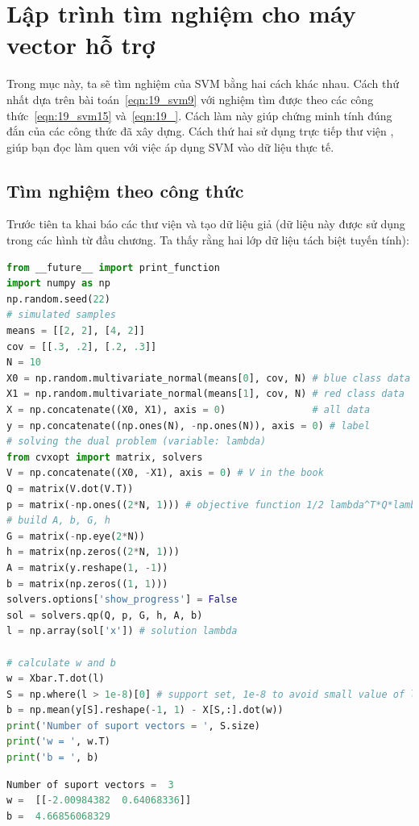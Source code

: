 \section{Lập trình tìm nghiệm cho máy vector hỗ trợ}

Trong mục này, ta sẽ tìm nghiệm của SVM bằng hai cách khác nhau. Cách
thứ nhất dựa trên bài toán~\eqref{eqn:19_svm9} với nghiệm tìm được theo các công
thức~\eqref{eqn:19_svm15} và~\eqref{eqn:19_}. Cách làm này giúp chứng minh tính đúng đắn
của các công thức đã xây dựng. Cách thứ hai sử dụng trực tiếp
thư viện , giúp bạn đọc làm quen với việc áp dụng SVM vào dữ liệu thực tế.


\subsection{Tìm nghiệm theo công thức }

Trước tiên ta khai báo các thư viện và tạo dữ liệu giả (dữ
liệu này được sử dụng trong các hình từ đầu chương. Ta thấy rằng hai lớp dữ liệu tách biệt tuyến tính):
\begin{lstlisting}[language=Python]
from __future__ import print_function
import numpy as np
np.random.seed(22)
# simulated samples
means = [[2, 2], [4, 2]]
cov = [[.3, .2], [.2, .3]]
N = 10
X0 = np.random.multivariate_normal(means[0], cov, N) # blue class data
X1 = np.random.multivariate_normal(means[1], cov, N) # red class data
X = np.concatenate((X0, X1), axis = 0)               # all data
y = np.concatenate((np.ones(N), -np.ones(N)), axis = 0) # label
# solving the dual problem (variable: lambda)
from cvxopt import matrix, solvers
V = np.concatenate((X0, -X1), axis = 0) # V in the book
Q = matrix(V.dot(V.T))
p = matrix(-np.ones((2*N, 1))) # objective function 1/2 lambda^T*Q*lambda - 1^T*lambda
# build A, b, G, h
G = matrix(-np.eye(2*N))
h = matrix(np.zeros((2*N, 1)))
A = matrix(y.reshape(1, -1))
b = matrix(np.zeros((1, 1)))
solvers.options['show_progress'] = False
sol = solvers.qp(Q, p, G, h, A, b)
l = np.array(sol['x']) # solution lambda

# calculate w and b
w = Xbar.T.dot(l)
S = np.where(l > 1e-8)[0] # support set, 1e-8 to avoid small value of l.
b = np.mean(y[S].reshape(-1, 1) - X[S,:].dot(w))
print('Number of suport vectors = ', S.size)
print('w = ', w.T)
print('b = ', b)
\end{lstlisting}
\kq
\begin{lstlisting}[language=Python]
Number of suport vectors =  3
w =  [[-2.00984382  0.64068336]]
b =  4.66856068329
\end{lstlisting}


